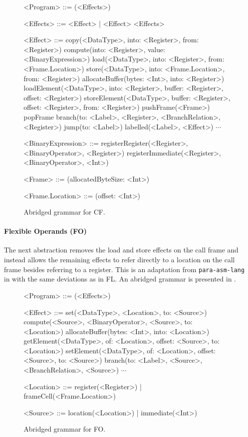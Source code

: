 \documentclass[main.tex]{subfiles}
\begin{document}
\begin{figure}[ht]
	\begin{grammar}
		
		<Program> ::= (<Effects>)
		
		<Effects> ::= <Effect> | <Effect> <Effects>
		
		<Effect> ::= copy(<DataType>, into: <Register>, from: <Register>)
			\alt compute(into: <Register>, value: <BinaryExpression>)
			\alt load(<DataType>, into: <Register>, from: <Frame.Location>)
			\alt store(<DataType>, into: <Frame.Location>, from: <Register>)
			\alt allocateBuffer(bytes: <Int>, into: <Register>)
			\alt loadElement(<DataType>, into: <Register>, buffer: <Register>, offset: <Register>)
			\alt storeElement(<DataType>, buffer: <Register>, offset: <Register>, from: <Register>)
			\alt pushFrame(<Frame>)
			\alt popFrame
			\alt branch(to: <Label>, <Register>, <BranchRelation>, <Register>)
			\alt jump(to: <Label>)
			\alt labelled(<Label>, <Effect>)
			\alt $\cdots$
		
		<BinaryExpression> ::= registerRegister(<Register>, <BinaryOperator>, <Register>)
			\alt registerImmediate(<Register>, <BinaryOperator>, <Int>)
		
		<Frame> ::= (allocatedByteSize: <Int>)
		
		<Frame.Location> ::= (offset: <Int>)
		
	\end{grammar}
	\caption{Abridged grammar for CF.}
	\label{bnf:cf}
\end{figure}

\paragraph{Flexible Operands (FO)} The next abstraction removes the load and store effects on the call frame and instead allows the remaining effects to refer directly to a location on the call frame besides referring to a register. This is an adaptation from \texttt{para-asm-lang} in \cite{:compcourse} with the same deviations as in FL. An abridged grammar is presented in .

\begin{figure}[ht]
	\begin{grammar}
		
		<Program> ::= (<Effects>)
		
		<Effect> ::= set(<DataType>, <Location>, to: <Source>)
			\alt compute(<Source>, <BinaryOperator>, <Source>, to: <Location>)
			\alt allocateBuffer(bytes: <Int>, into: <Location>)
			\alt getElement(<DataType>, of: <Location>, offset: <Source>, to: <Location>)
			\alt setElement(<DataType>, of: <Location>, offset: <Source>, to: <Source>)
			\alt branch(to: <Label>, <Source>, <BranchRelation>, <Source>)
			\alt $\cdots$
		
		<Location> ::= register(<Register>) | frameCell(<Frame.Location>)
		
		<Source> ::= location(<Location>) | immediate(<Int>)
		
	\end{grammar}
	\caption{Abridged grammar for FO.}
	\label{bnf:fo}
\end{figure}
\end{document}

